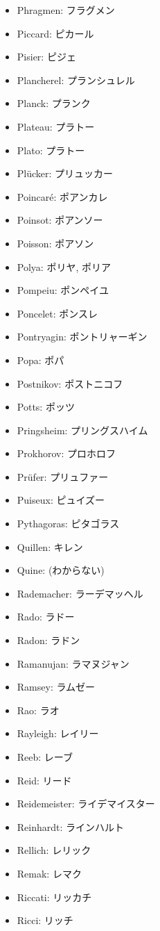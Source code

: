 \documentclass[openany, a4paper, oneside]{jsbook}
\begin{document}
\begin{itemize}
\item Phragmen: フラグメン
\item Piccard: ピカール
\item Pisier: ピジェ
\item Plancherel: プランシュレル
\item Planck: プランク
\item Plateau: プラトー
\item Plato: プラトー
\item Pl\"ucker: プリュッカー
\item Poincar\'e: ポアンカレ
\item Poinsot: ポアンソー
\item Poisson: ポアソン
\item Polya: ポリヤ, ポリア
\item Pompeiu: ポンペイユ
\item Poncelet: ポンスレ
\item Pontryagin: ポントリャーギン
\item Popa: ポパ
\item Postnikov: ポストニコフ
\item Potts: ポッツ
\item Pringsheim: プリングスハイム
\item Prokhorov: プロホロフ
\item Pr\"ufer: プリュファー
\item Puiseux: ピュイズー
\item Pythagoras: ピタゴラス
\item Quillen: キレン
\item Quine: (わからない)
\item Rademacher: ラーデマッヘル
\item Rado: ラドー
\item Radon: ラドン
\item Ramanujan: ラマヌジャン
\item Ramsey: ラムゼー
\item Rao: ラオ
\item Rayleigh: レイリー
\item Reeb: レーブ
\item Reid: リード
\item Reidemeister: ライデマイスター
\item Reinhardt: ラインハルト
\item Rellich: レリック
\item Remak: レマク
\item Riccati: リッカチ
\item Ricci: リッチ

\end{itemize}
\end{document}
